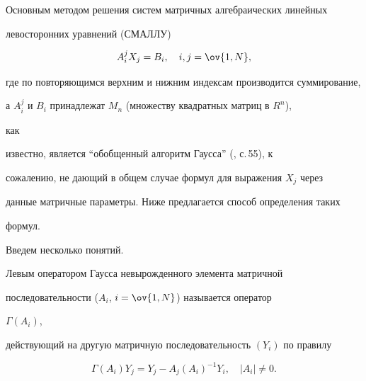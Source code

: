  


\pagestyle{plain} %


 


 




 


\maketitle 


\label{begin} 


 


Основным методом решения систем матричных алгебраических линейных 


левосторонних уравнений (СМАЛЛУ) 


\begin{equation} 


A^j_i X_j=B_i,\quad i,j=\ov{1,N}, 


\end{equation} 


где по повторяющимся верхним и нижним индексам производится суммирование, 


а $A^j_i$ и $B_i$ принадлежат $M_n$ (множеству квадратных матриц в $R^n$), 


как 


известно, является ``обобщенный алгоритм Гаусса'' (\cite{1}, с.\,55), к 


сожалению, не дающий в общем случае формул для выражения $X_j$ через 


данные матричные параметры. Ниже предлагается способ определения таких 


формул. 


 


Введем несколько понятий. 


 


\begin{defn} 


Левым оператором Гаусса невырожденного элемента матричной 


последовательности ($A_i$, $i=\ov{1,N}$) называется оператор 


$\Gamma(A_i)$, 


действующий на другую матричную последовательность $(Y_i)$ по правилу 


$$ 


\Gamma(A_i)Y_j=Y_j-A_j(A_i)^{-1}Y_i,\quad |A_i|\ne 0. 


$$ 


\end{defn} 


